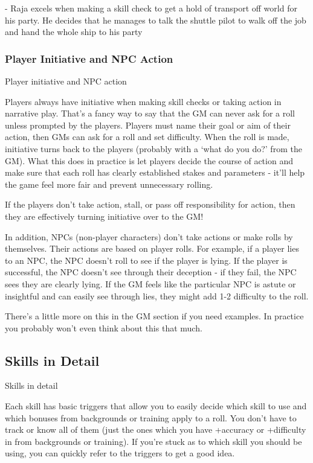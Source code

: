          - Raja excels when making a skill check to get a hold of transport off world for his party.
         He decides that he manages to talk the shuttle pilot to walk off the job and hand the
         whole ship to his party

\subsubsection{Player Initiative and NPC Action}
                                 Player initiative and NPC action


Players always have initiative when making skill checks or taking action in narrative play. That’s
a fancy way to say that the GM can never ask for a roll unless prompted by the players. Players
must name their goal or aim of their action, then GMs can ask for a roll and set difficulty. When
the roll is made, initiative turns back to the players (probably with a ‘what do you do?’ from the
GM). What this does in practice is let players decide the course of action and make sure that
each roll has clearly established stakes and parameters - it’ll help the game feel more fair and
prevent unnecessary rolling.


If the players don’t take action, stall, or pass off responsibility for action, then they are
effectively turning initiative over to the GM!


In addition, NPCs (non-player characters) don’t take actions or make rolls by themselves. Their
actions are based on player rolls. For example, if a player lies to an NPC, the NPC doesn’t roll to
see if the player is lying. If the player is successful, the NPC doesn’t see through their deception
- if they fail, the NPC sees they are clearly lying. If the GM feels like the particular NPC is astute
or insightful and can easily see through lies, they might add 1-2 difficulty to the roll.


There’s a little more on this in the GM section if you need examples. In practice you probably
won’t even think about this that much.

\subsection{Skills in Detail}
                                               Skills in detail


Each skill has basic triggers that allow you to easily decide which skill to use and which
bonuses from backgrounds or training apply to a roll. You don’t have to track or know all of
them (just the ones which you have +accuracy or +difficulty in from backgrounds or training). If
you’re stuck as to which skill you should be using, you can quickly refer to the triggers to get a
good idea.


